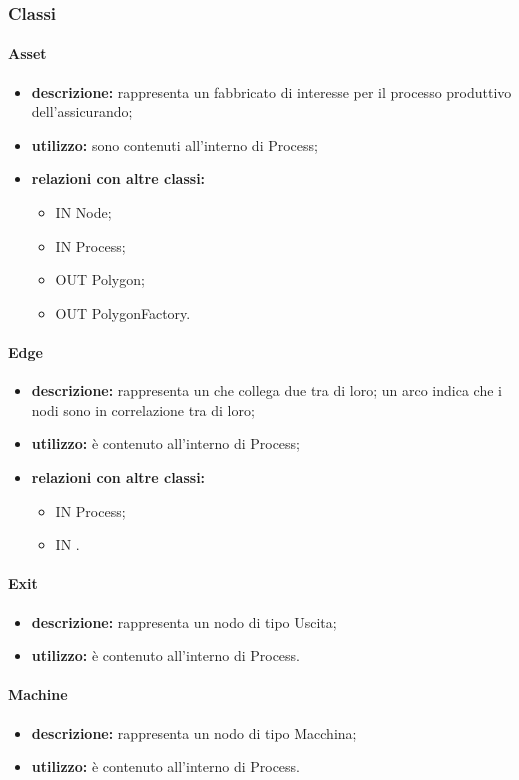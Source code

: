 \subsubsection{Classi}
\paragraph{Asset}
\begin{itemize}
	\item \textbf{descrizione:} rappresenta un fabbricato di interesse per il processo produttivo dell'assicurando;
	\item \textbf{utilizzo:} sono contenuti all'interno di Process;
	\item \textbf{relazioni con altre classi:} 
	\begin{itemize}
		\item IN Node;
		\item IN Process;
		\item OUT Polygon;
		\item OUT PolygonFactory.
	\end{itemize}
\end{itemize}
\paragraph{Edge}
\begin{itemize}
	\item \textbf{descrizione:} rappresenta un  che collega due  tra di loro; un arco indica che i nodi sono in correlazione tra di loro;
	\item \textbf{utilizzo:} è contenuto all'interno di Process;
	\item \textbf{relazioni con altre classi:} 
	\begin{itemize}
		\item IN Process;
		\item IN .
	\end{itemize}
\end{itemize}
\paragraph{Exit}
\begin{itemize}
	\item \textbf{descrizione:} rappresenta un nodo di tipo Uscita;
	\item \textbf{utilizzo:} è contenuto all'interno di Process.
\end{itemize}
\paragraph{Machine}
\begin{itemize}
	\item \textbf{descrizione:} rappresenta un nodo di tipo Macchina;
	\item \textbf{utilizzo:} è contenuto all'interno di Process.
\end{itemize}
